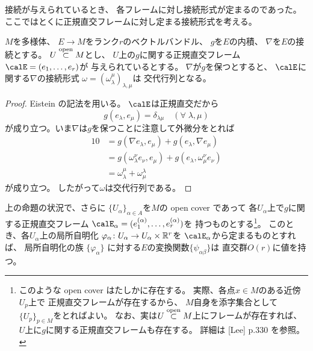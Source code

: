 \documentclass[report]{jlreq}
\begin{document}
接続が与えられているとき、
各フレームに対し接続形式が定まるのであった。
ここではとくに正規直交フレームに対し定まる接続形式を考える。

\begin{proposition}[正規直交フレームに関する接続形式]
    $M$を多様体、
    $E \to M$をランク$r$のベクトルバンドル、
    $g$を$E$の内積、
    $\nabla$を$E$の接続とする。
    $U \stackrel{\text{open}}{\subset} M$とし、
    $U$上の$g$に関する正規直交フレーム
    $\calE = (e_1, \ldots, e_r)$が
    与えられているとする。
    $\nabla$が$g$を保つとすると、
    $\calE$に関する$\nabla$の接続形式
    $\omega = (\omega_\lambda^\mu)_{\lambda, \mu}$は
    交代行列となる。
\end{proposition}

\begin{proof}
    Eistein の記法を用いる。
    $\calE$は正規直交だから
    \begin{equation}
        g(e_\lambda, e_\mu) = \delta_{\lambda\mu}
            \quad (\forall \; \lambda, \mu)
    \end{equation}
    が成り立つ。いま$\nabla$は$g$を保つことに注意して外微分をとれば
    \begin{alignat}{1}
        0 &= g(\nabla e_\lambda, e_\mu) + g(e_\lambda, \nabla e_\mu) \\
            &= g(\omega_\lambda^\nu e_\nu, e_\mu) + g(e_\lambda, \omega_\mu^\nu e_\nu) \\
            &= \omega_\lambda^\mu + \omega_\mu^\lambda
    \end{alignat}
    が成り立つ。
    したがって$\omega$は交代行列である。
\end{proof}

\begin{proposition}[変換関数は直交群に値を持つ]
    上の命題の状況で、さらに
    $\{ U_\alpha \}_{\alpha \in A}$を$M$の open cover であって
    各$U_\alpha$上で$g$に関する正規直交フレーム
    $\calE_\alpha = (e^{(\alpha)}_1, \dots, e^{(\alpha)}_r)$を
    持つものとする\footnote{
        このような open cover はたしかに存在する。
        実際、各点$x \in M$のある近傍$U_p$上で
        正規直交フレームが存在するから、
        $M$自身を添字集合として$\{ U_p \}_{p \in M}$をとればよい。
        なお、実は$U \stackrel{\text{open}}{\subset} M$上にフレームが存在すれば、
        $U$上に$g$に関する正規直交フレームも存在する。
        詳細は [Lee] p.330 を参照。
    }。
    このとき、各$U_\alpha$上の局所自明化
    $\varphi_\alpha \colon U_\alpha \to U_\alpha \times \mathbb{R}^r$を
    $\calE_\alpha$から定まるものとすれば、
    局所自明化の族
    $\{ \varphi_\alpha \}$
    に対する$E$の変換関数$\{ \psi_{\alpha\beta} \}$は
    直交群$O(r)$に値を持つ。
\end{proposition}
\end{document}
